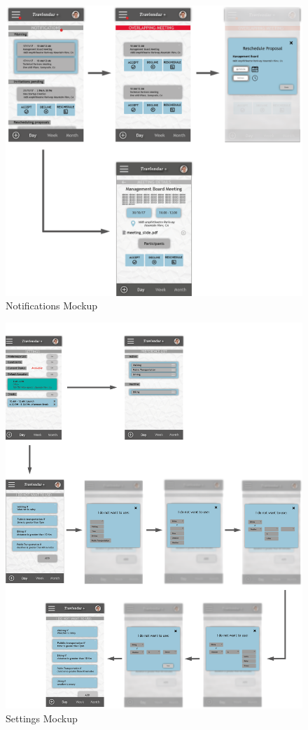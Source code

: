 \begin{figure}[h]
\centering\includegraphics[scale = 0.3]{Images/Mockups/Notifications+.png}{}
\caption{Notifications Mockup}
\end{figure}

\begin{figure}[h]
\centering\includegraphics[width = \textwidth, scale = 0.3]{Images/Mockups/Settings+.png}{}
\caption{Settings Mockup}
\end{figure}
\clearpage